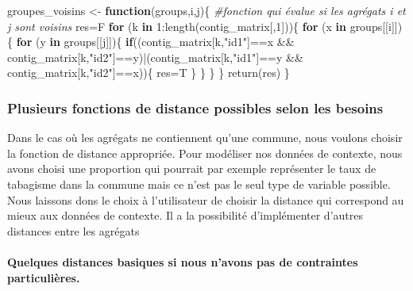 \documentclass[
]{article}
\newenvironment{Shaded}{\begin{snugshade}}{\end{snugshade}}
\newcommand{\CommentTok}[1]{\textcolor[rgb]{0.56,0.35,0.01}{\textit{#1}}}
\newcommand{\ControlFlowTok}[1]{\textcolor[rgb]{0.13,0.29,0.53}{\textbf{#1}}}
\newcommand{\DecValTok}[1]{\textcolor[rgb]{0.00,0.00,0.81}{#1}}
\newcommand{\FunctionTok}[1]{\textcolor[rgb]{0.00,0.00,0.00}{#1}}
\newcommand{\NormalTok}[1]{#1}
\newcommand{\OtherTok}[1]{\textcolor[rgb]{0.56,0.35,0.01}{#1}}
\newcommand{\SpecialCharTok}[1]{\textcolor[rgb]{0.00,0.00,0.00}{#1}}
\newcommand{\StringTok}[1]{\textcolor[rgb]{0.31,0.60,0.02}{#1}}
\begin{document}
\begin{Shaded}
\begin{Highlighting}[]
\NormalTok{groupes\_voisins }\OtherTok{\textless{}{-}} \ControlFlowTok{function}\NormalTok{(groups,i,j)\{ }\CommentTok{\#fonction qui évalue si les agrégats i et j sont voisins}
\NormalTok{  res}\OtherTok{=}\NormalTok{F}
  \ControlFlowTok{for}\NormalTok{ (k }\ControlFlowTok{in} \DecValTok{1}\SpecialCharTok{:}\FunctionTok{length}\NormalTok{(contig\_matrix[,}\DecValTok{1}\NormalTok{]))\{}
    \ControlFlowTok{for}\NormalTok{ (x }\ControlFlowTok{in}\NormalTok{ groups[[i]])\{}
      \ControlFlowTok{for}\NormalTok{ (y }\ControlFlowTok{in}\NormalTok{ groups[[j]])\{}
        \ControlFlowTok{if}\NormalTok{((contig\_matrix[k,}\StringTok{"id1"}\NormalTok{]}\SpecialCharTok{==}\NormalTok{x }\SpecialCharTok{\&\&}\NormalTok{ contig\_matrix[k,}\StringTok{"id2"}\NormalTok{]}\SpecialCharTok{==}\NormalTok{y)}\SpecialCharTok{|}\NormalTok{(contig\_matrix[k,}\StringTok{"id1"}\NormalTok{]}\SpecialCharTok{==}\NormalTok{y }\SpecialCharTok{\&\&}\NormalTok{ contig\_matrix[k,}\StringTok{"id2"}\NormalTok{]}\SpecialCharTok{==}\NormalTok{x))\{}
\NormalTok{          res}\OtherTok{=}\NormalTok{T}
\NormalTok{        \}}
\NormalTok{      \}}
\NormalTok{    \}}
\NormalTok{  \}}
  \FunctionTok{return}\NormalTok{(res)}
\NormalTok{\}}
\end{Highlighting}
\end{Shaded}

\hypertarget{plusieurs-fonctions-de-distance-possibles-selon-les-besoins}{%
\subsubsection{Plusieurs fonctions de distance possibles selon les
besoins}\label{plusieurs-fonctions-de-distance-possibles-selon-les-besoins}}

Dans le cas où les agrégats ne contiennent qu'une commune, nous voulons
choisir la fonction de distance appropriée. Pour modéliser nos données
de contexte, nous avons choisi une proportion qui pourrait par exemple
représenter le taux de tabagisme dans la commune mais ce n'est pas le
seul type de variable possible. Nous laissons dons le choix à
l'utilisateur de choisir la distance qui correspond au mieux aux données
de contexte. Il a la possibilité d'implémenter d'autres distances entre
les agrégats

\hypertarget{quelques-distances-basiques-si-nous-navons-pas-de-contraintes-particuliuxe8res.}{%
\paragraph{Quelques distances basiques si nous n'avons pas de
contraintes
particulières.}\label{quelques-distances-basiques-si-nous-navons-pas-de-contraintes-particuliuxe8res.}}
\end{document}
